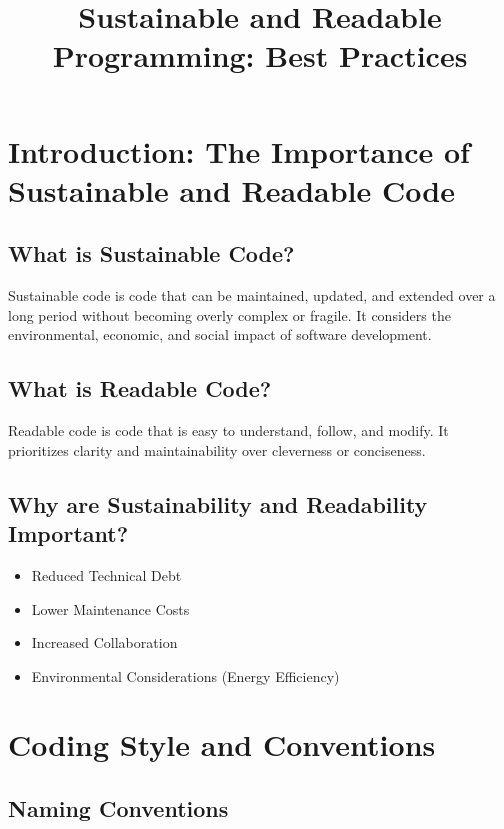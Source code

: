 \documentclass{book}
\title{Sustainable and Readable Programming: Best Practices}
\author{}
\date{}
\begin{document}
\maketitle

\tableofcontents

\chapter{Introduction: The Importance of Sustainable and Readable Code}

\section{What is Sustainable Code?}

Sustainable code is code that can be maintained, updated, and extended over a long period without becoming overly complex or fragile. It considers the environmental, economic, and social impact of software development.

\section{What is Readable Code?}

Readable code is code that is easy to understand, follow, and modify. It prioritizes clarity and maintainability over cleverness or conciseness.

\section{Why are Sustainability and Readability Important?}
\begin{itemize}
    \item Reduced Technical Debt
    \item Lower Maintenance Costs
    \item Increased Collaboration
    \item Environmental Considerations (Energy Efficiency)
\end{itemize}

\chapter{Coding Style and Conventions}

\section{Naming Conventions}
\end{document}
